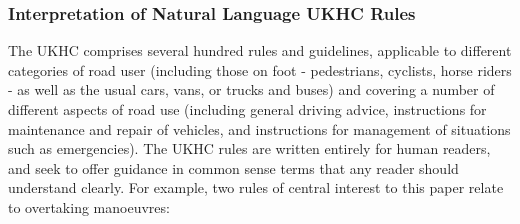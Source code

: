 \subsubsection{Interpretation of Natural Language UKHC Rules} \label{interp_nat_lang_UKHC_rules}

The UKHC comprises several hundred rules and guidelines, applicable to different categories of road user (including those on foot - pedestrians, cyclists, horse riders - as well as the usual cars, vans, or trucks and buses) and covering a number of different aspects of road use (including general driving advice, instructions for maintenance and repair of vehicles, and instructions for management of situations such as emergencies). The UKHC rules are written entirely for human readers, and seek to offer guidance in common sense terms that any reader should understand clearly. For example, two rules of central interest to this paper relate to overtaking manoeuvres:
